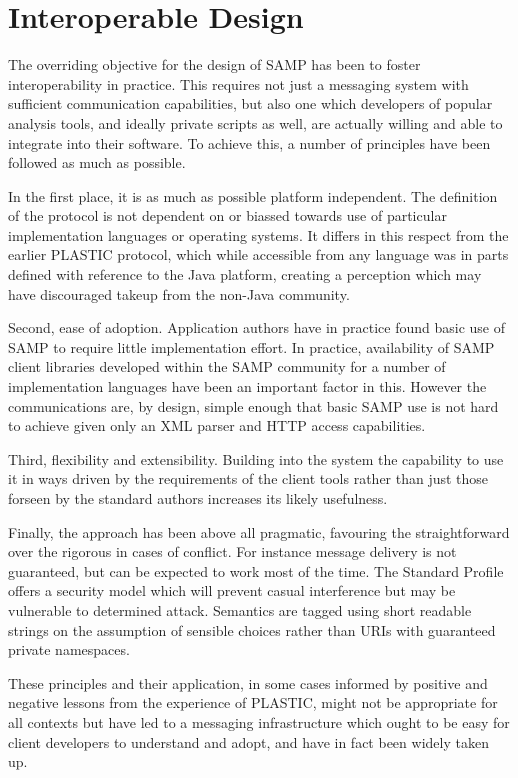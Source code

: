 \documentclass[5p]{elsarticle}
\begin{document}
\section{Interoperable Design} \label{sec:design}

The overriding objective for the design of SAMP
has been to foster interoperability in practice.
This requires not just a messaging system with sufficient communication
capabilities, but also one which developers of popular analysis tools,
and ideally private scripts as well,
are actually willing and able to integrate into their software.
To achieve this, a number of principles
have been followed as much as possible.

In the first place, it is as much as possible platform independent.
The definition of the protocol is not dependent on or biassed
towards use of particular implementation languages or operating systems.
It differs in this respect from the earlier PLASTIC protocol,
which while accessible from any language was in parts defined with
reference to the Java platform, creating a perception which may
have discouraged takeup from the non-Java community.

Second, ease of adoption.
Application authors have in practice found basic use of 
SAMP to require little implementation effort.
In practice, availability of SAMP client libraries
developed within the SAMP community
for a number of implementation languages have been an important
factor in this.
However the communications are, by design, simple enough that
basic SAMP use is not hard to achieve given only an XML parser
and HTTP access capabilities.

Third, flexibility and extensibility.
Building into the system the capability to use it in ways
driven by the requirements of the client tools rather than
just those forseen by the standard authors increases its likely usefulness.

Finally, the approach has been above all pragmatic, favouring
the straightforward over the rigorous in cases of conflict.
For instance message delivery is not guaranteed, but can be 
expected to work most of the time.  The Standard Profile offers
a security model which will prevent casual interference
but may be vulnerable to determined attack.  Semantics are tagged
using short readable strings on the assumption of sensible choices
rather than URIs with guaranteed private namespaces.

These principles and their application, in some cases informed
by positive and negative lessons from the experience of PLASTIC,
might not be appropriate for all contexts
but have led to a messaging infrastructure which ought to be easy
for client developers to understand and adopt, and have in fact
been widely taken up.
\end{document}

